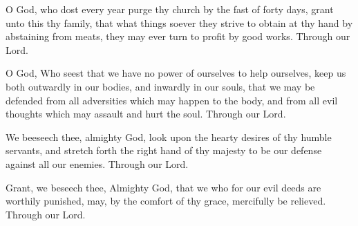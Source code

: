 \documentclass[12pt]{book}
\begin{document}

\smallskip


{\noindent O God, who dost every year purge thy church by the fast of forty days, grant unto this thy family, that what things soever they strive to obtain at thy hand by abstaining from meats, they may ever turn to profit by good works. Through our Lord.}
    

{\noindent O God, Who seest that we have no power of ourselves to help ourselves, keep us both outwardly in our bodies, and inwardly in our souls, that we may be defended from all adversities which may happen to the body, and from all evil thoughts which may assault and hurt the soul. Through our Lord.}
    

{\noindent We beeseech thee, almighty God, look upon the hearty desires of thy humble servants, and stretch forth the right hand of thy majesty to be our defense against all our enemies. Through our Lord.}
    

{\noindent Grant, we beseech thee, Almighty God, that we who for our evil deeds are worthily punished, may, by the comfort of thy grace, mercifully be relieved. Through our Lord.}
    
\end{document}
